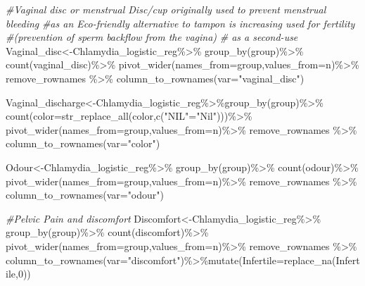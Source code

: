 \documentclass[
]{article}
\newenvironment{Shaded}{\begin{snugshade}}{\end{snugshade}}
\newcommand{\AttributeTok}[1]{\textcolor[rgb]{0.77,0.63,0.00}{#1}}
\newcommand{\CommentTok}[1]{\textcolor[rgb]{0.56,0.35,0.01}{\textit{#1}}}
\newcommand{\DecValTok}[1]{\textcolor[rgb]{0.00,0.00,0.81}{#1}}
\newcommand{\FunctionTok}[1]{\textcolor[rgb]{0.00,0.00,0.00}{#1}}
\newcommand{\NormalTok}[1]{#1}
\newcommand{\OtherTok}[1]{\textcolor[rgb]{0.56,0.35,0.01}{#1}}
\newcommand{\SpecialCharTok}[1]{\textcolor[rgb]{0.00,0.00,0.00}{#1}}
\newcommand{\StringTok}[1]{\textcolor[rgb]{0.31,0.60,0.02}{#1}}
\begin{document}
\begin{Shaded}
\begin{Highlighting}[]
\CommentTok{\#Vaginal disc or menstrual Disc/cup originally used to prevent menstrual bleeding}
\CommentTok{\#as an Eco{-}friendly alternative to tampon is increasing used for fertility}
\CommentTok{\#(prevention of sperm backflow from the vagina)}
\CommentTok{\# as a second{-}use}
\NormalTok{Vaginal\_disc}\OtherTok{\textless{}{-}}\NormalTok{Chlamydia\_logistic\_reg}\SpecialCharTok{\%\textgreater{}\%}
  \FunctionTok{group\_by}\NormalTok{(group)}\SpecialCharTok{\%\textgreater{}\%}
  \FunctionTok{count}\NormalTok{(vaginal\_disc)}\SpecialCharTok{\%\textgreater{}\%}
  \FunctionTok{pivot\_wider}\NormalTok{(}\AttributeTok{names\_from=}\NormalTok{group,}\AttributeTok{values\_from=}\NormalTok{n)}\SpecialCharTok{\%\textgreater{}\%}\NormalTok{ remove\_rownames }\SpecialCharTok{\%\textgreater{}\%}
  \FunctionTok{column\_to\_rownames}\NormalTok{(}\AttributeTok{var=}\StringTok{"vaginal\_disc"}\NormalTok{) }

\NormalTok{Vaginal\_discharge}\OtherTok{\textless{}{-}}\NormalTok{Chlamydia\_logistic\_reg}\SpecialCharTok{\%\textgreater{}\%}\FunctionTok{group\_by}\NormalTok{(group)}\SpecialCharTok{\%\textgreater{}\%}
  \FunctionTok{count}\NormalTok{(}\AttributeTok{color=}\FunctionTok{str\_replace\_all}\NormalTok{(color,}\FunctionTok{c}\NormalTok{(}\StringTok{"NIL"}\OtherTok{=}\StringTok{"Nil"}\NormalTok{)))}\SpecialCharTok{\%\textgreater{}\%}
  \FunctionTok{pivot\_wider}\NormalTok{(}\AttributeTok{names\_from=}\NormalTok{group,}\AttributeTok{values\_from=}\NormalTok{n)}\SpecialCharTok{\%\textgreater{}\%}\NormalTok{ remove\_rownames }\SpecialCharTok{\%\textgreater{}\%}
  \FunctionTok{column\_to\_rownames}\NormalTok{(}\AttributeTok{var=}\StringTok{"color"}\NormalTok{) }

\NormalTok{Odour}\OtherTok{\textless{}{-}}\NormalTok{Chlamydia\_logistic\_reg}\SpecialCharTok{\%\textgreater{}\%}
  \FunctionTok{group\_by}\NormalTok{(group)}\SpecialCharTok{\%\textgreater{}\%}
  \FunctionTok{count}\NormalTok{(odour)}\SpecialCharTok{\%\textgreater{}\%}
  \FunctionTok{pivot\_wider}\NormalTok{(}\AttributeTok{names\_from=}\NormalTok{group,}\AttributeTok{values\_from=}\NormalTok{n)}\SpecialCharTok{\%\textgreater{}\%}\NormalTok{ remove\_rownames }\SpecialCharTok{\%\textgreater{}\%}
  \FunctionTok{column\_to\_rownames}\NormalTok{(}\AttributeTok{var=}\StringTok{"odour"}\NormalTok{)}

\CommentTok{\#Pelvic Pain and discomfort}
\NormalTok{Discomfort}\OtherTok{\textless{}{-}}\NormalTok{Chlamydia\_logistic\_reg}\SpecialCharTok{\%\textgreater{}\%}
  \FunctionTok{group\_by}\NormalTok{(group)}\SpecialCharTok{\%\textgreater{}\%}
  \FunctionTok{count}\NormalTok{(discomfort)}\SpecialCharTok{\%\textgreater{}\%}
  \FunctionTok{pivot\_wider}\NormalTok{(}\AttributeTok{names\_from=}\NormalTok{group,}\AttributeTok{values\_from=}\NormalTok{n)}\SpecialCharTok{\%\textgreater{}\%}\NormalTok{ remove\_rownames }\SpecialCharTok{\%\textgreater{}\%}
  \FunctionTok{column\_to\_rownames}\NormalTok{(}\AttributeTok{var=}\StringTok{"discomfort"}\NormalTok{)}\SpecialCharTok{\%\textgreater{}\%}\FunctionTok{mutate}\NormalTok{(}\AttributeTok{Infertile=}\FunctionTok{replace\_na}\NormalTok{(Infertile,}\DecValTok{0}\NormalTok{))}


\end{Highlighting}
\end{Shaded}
\end{document}

